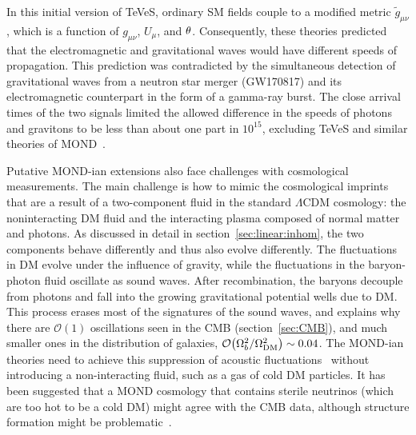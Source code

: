 \smallskip

In this initial version of TeVeS, ordinary SM fields couple to a modified metric $\tilde g_{\mu\nu}$, which is a function of
$g_{\mu\nu}$, $U_\mu$, and $\theta$. 
Consequently, these theories predicted that the electromagnetic and gravitational waves would have different  speeds of propagation. 
This prediction was contradicted by the simultaneous detection of gravitational waves from a neutron star
merger (GW170817) and its electromagnetic counterpart in the form of a gamma-ray burst.
The close arrival times of the two signals limited
the allowed difference in the speeds of photons and gravitons to be less than about one part in $10^{15}$, 
excluding TeVeS and similar theories of MOND~\cite{GWandMOND}.


\smallskip

Putative MOND-ian extensions also face challenges with cosmological measurements. 
The main challenge is how to mimic the cosmological imprints that are a result of a two-component fluid in the standard $\Lambda$CDM cosmology: the noninteracting DM fluid and the interacting plasma composed of normal matter and photons. 
As discussed in detail in section~\ref{sec:linear:inhom},
the two components behave differently and thus also evolve differently. The fluctuations in DM evolve under the influence of gravity, while the fluctuations in the baryon-photon fluid oscillate as sound waves. 
After recombination, the baryons decouple from photons and fall into the growing gravitational potential wells due to DM. 
This process erases most of the signatures of the sound waves, and  explains why there are ${\mathcal O}(1)$ oscillations seen in the CMB (section~\ref{sec:CMB}), 
and much smaller ones in the distribution of galaxies,  ${\mathcal O}\big(\Omega_b^2/\Omega_{\rm DM}^2\big)\sim 0.04$.
The MOND-ian theories need to achieve this suppression of acoustic fluctuations~\cite{MONDcosmo} without introducing a non-interacting fluid, such as a gas of cold DM particles.
It has been suggested that a MOND cosmology that contains sterile neutrinos (which are too hot to be a cold DM) might agree with the CMB data,
although structure formation might be problematic~\cite{MONDcosmo}.

\medskip


